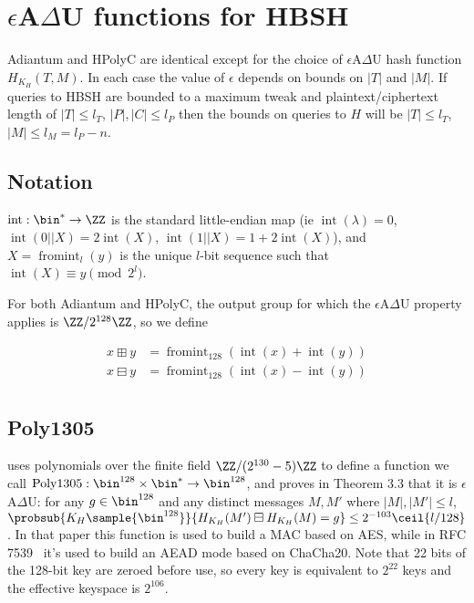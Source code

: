 \documentclass[journal=tosc,preprint,floatrow,submission]{iacrtrans}
\DeclareMathOperator{\Polydjb}{Poly1305}
\DeclareMathOperator{\intify}{int}
\DeclareMathOperator{\fromint}{fromint}
\begin{document}
\printbibliography

\appendix
\section{$\epsilon$A$\Delta$U functions for HBSH}\label{hashing}

Adiantum and HPolyC are identical except for the choice of $\epsilon$A$\Delta$U hash function
$H_{K_H}(T, M)$. In each case the value of $\epsilon$ depends on bounds on $|T|$ and $|M|$.
If queries to HBSH are bounded to a maximum tweak and plaintext/ciphertext length of
$|T| \leq l_T$, $|P|, |C| \leq l_P$
then the bounds on queries to $H$ will be $|T| \leq l_T$, $|M| \leq l_M = l_P - n$.

\subsection{Notation}

$\intify: \bin^{*} \rightarrow \ZZ$ is the
standard little-endian map
(ie $\intify(\lambda) = 0$, $\intify(0 || X) = 2\intify(X)$, $\intify(1 || X) = 1 + 2\intify(X)$),
and $X = \fromint_l(y)$ is the unique
$l$-bit sequence such that $\intify(X) \equiv y \pmod{2^l}$.

For both Adiantum and HPolyC,
the output group for which the $\epsilon$A$\Delta$U property applies is
$\ZZ/2^{128}\ZZ$, so we define

\begin{align*}
    x \boxplus y &= \fromint_{128}(\intify(x) + \intify(y)) \\
    x \boxminus y &= \fromint_{128}(\intify(x) - \intify(y)) \\
\end{align*}

\subsection{Poly1305}

\cite{poly1305} uses polynomials over the finite field $\ZZ/(2^{130}-5)\ZZ$
to define a function we call
$\Polydjb: \bin^{128} \times \bin^* \rightarrow \bin^{128}$,
and proves in Theorem 3.3 that it is $\epsilon$A$\Delta$U: for any
$g \in \bin^{128}$ and any distinct messages $M, M'$ where $|M|, |M'| \leq l$,
$\probsub{K_H \sample{\bin^{128}}}{H_{K_H}(M') \boxminus H_{K_H}(M) = g} \leq 2^{-103}\ceil{l/128}$.
In that paper this function is used to build a MAC based on AES, while in
RFC 7539~\cite{RFC7539} it's used to build an AEAD mode based on ChaCha20.
Note that 22 bits of the 128-bit key are zeroed before use, so every key is equivalent to
$2^{22}$ keys and the effective keyspace is $2^{106}$.
\end{document}
